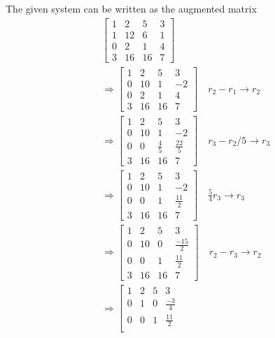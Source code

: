 \documentclass[]{article}
\begin{document}
\subsection{}

The given system can be written as the augmented matrix
\begin{align}
	&\left[
	\begin{array}{ccc|c}
	1 & 2 & 5 & 3 \\
	1 & 12 & 6 & 1 \\
	0 & 2 & 1 & 4 \\
	3 & 16 & 16 & 7
	\end{array}
	\right] \\
	&\Rightarrow \left[
	\begin{array}{ccc|c}
	1 & 2 & 5 & 3 \\
	0 & 10 & 1 & -2 \\
	0 & 2 & 1 & 4 \\
	3 & 16 & 16 & 7
	\end{array}
	\right] \quad r_2 - r_1 \to r_2 \\
	&\Rightarrow \left[
	\begin{array}{ccc|c}
	1 & 2 & 5 & 3 \\
	0 & 10 & 1 & -2 \\
	0 & 0 & \frac{4}{5} & \frac{22}{5} \\
	3 & 16 & 16 & 7
	\end{array}
	\right] \quad r_3 - r_2/5 \to r_3 \\
	&\Rightarrow \left[
	\begin{array}{ccc|c}
	1 & 2 & 5 & 3 \\
	0 & 10 & 1 & -2 \\
	0 & 0 & 1 & \frac{11}{2} \\
	3 & 16 & 16 & 7
	\end{array}
	\right] \quad \frac{5}{4}r_3 \to r_3 \\	
	&\Rightarrow \left[
	\begin{array}{ccc|c}
	1 & 2 & 5 & 3 \\
	0 & 10 & 0 & \frac{-15}{2} \\
	0 & 0 & 1 & \frac{11}{2} \\
	3 & 16 & 16 & 7
	\end{array}
	\right] \quad r_2 - r_3 \to r_2 \\
	&\Rightarrow \left[
	\begin{array}{ccc|c}
	1 & 2 & 5 & 3 \\
	0 & 1 & 0 & \frac{-3}{4} \\
	0 & 0 & 1 & \frac{11}{2} \\

\end{array}
\end{align}
\end{document}
